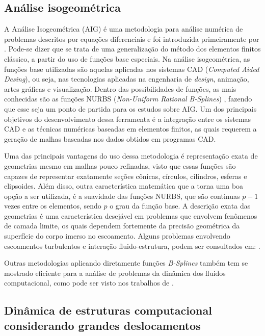 \subsection{Análise isogeométrica}
\label{AIGsection}

A Análise Isogeométrica (AIG) é uma metodologia para análise numérica de problemas descritos por equações diferenciais e foi introduzida primeiramente por . Pode-se dizer que se trata de uma generalização do método dos elementos finitos clássico, a partir do uso de funções base especiais. Na análise isogeométrica, as funções base utilizadas são aquelas aplicadas nos sistemas CAD (\textit{Computed Aided Desing}), ou seja, nas tecnologias aplicadas na engenharia de \textit{design}, animação, artes gráficas e visualização.  Dentro das possibilidades de funções, as mais conhecidas são as funções NURBS (\textit{Non-Uniform Rational B-Splines}) \cite{PiegT:1996}, fazendo que esse seja um ponto de partida para os estudos sobre AIG. Um dos principais objetivos do desenvolvimento dessa ferramenta é a integração entre os sistemas CAD e as técnicas numéricas baseadas em elementos finitos, as quais requerem a geração de malhas baseadas nos dados obtidos em programas CAD. 
		
Uma das principais vantagens do uso dessa metodologia é representação exata de geometrias mesmo em malhas pouco refinadas, visto que essas funções são capazes de representar exatamente seções cônicas, círculos, cilindros, esferas e elipsoides. Além disso, outra característica matemática que a torna uma boa opção a ser utilizada, é a suavidade das funções NURBS, que são continuas $p-1$ vezes entre os elementos, sendo $p$ o grau da função base. A descrição exata das geometrias é uma característica desejável em problemas que envolvem fenômenos de camada limite, os quais dependem fortemente da precisão geométrica da superfície do corpo imerso no escoamento. Alguns problemas envolvendo escoamentos turbulentos e interação fluido-estrutura, podem ser consultados em: .
	
Outras metodologias aplicando diretamente funções \textit{B-Splines} também tem se mostrado eficiente para a análise de problemas da dinâmica dos fluidos computacional, como pode ser visto nos trabalhos de .


\subsection{Dinâmica de estruturas computacional considerando grandes deslocamentos}
\label{csdsection}

